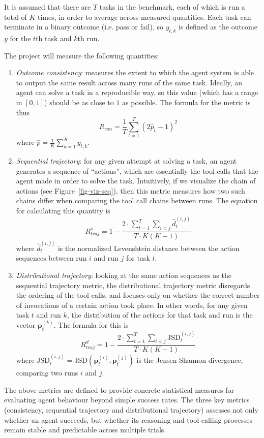 \documentclass[conference]{IEEEtran}
\begin{document}
It is assumed that there are $T$ tasks in the benchmark, each of which is run a total of $K$ times,
in order to average across measured quantities.
Each task can terminate in a binary outcome (i.e. pass or fail), so $y_{t,k}$ is defined as the
outcome $y$ for the $t$th task and $k$th run.

The project will measure the following quantities:
\begin{enumerate}
	\item \emph{Outcome consistency}: measures the extent to which the agent system is able to output
		the same result across many runs of the same task. Ideally, an agent can solve a task in a
		reproducible way, so this value (which has a range in $[0,1]$) should be as close to
		$1$ as possible. The formula for the metric is thus
		$$R_{con} = \frac{1}{T} \sum_{t=1}^T (2\hat{p}_t-1)^2$$
		where $\hat{p} = \frac{1}{K} \sum_{k=1}^K y_{t,k}$.\\
	\item \emph{Sequential trajectory}: for any given attempt at solving a task, an agent
		generates a sequence of ``actions'', which are essentially the tool calls that the agent
		made in order to solve the task. Intuitively, if we visualize the chain of actions
		(see Figure~\ref{fig-viz-seq}), then 
		this metric measures how two such chains differ when comparing the tool call chains
		between runs. The equation for calculating this quantity is
		$$R_{traj}^s = 1 - \frac{2\cdot\sum_{t=1}^T \sum_{i<j} \hat{d}_t^{(i,j)}}{T\cdot K (K-1)}$$
		where $\hat{d}_t^{(i,j)}$ is the normalized Levenshtein distance between the action
		sequences between run $i$ and run $j$ for task $t$.
	\item \emph{Distributional trajectory}: looking at the same action sequences as the sequential
		trajectory metric, the distributional trajectory metric disregards the ordering of the tool
		calls, and focuses only on whether the correct number of invocations of a certain action
		took place. In other words, for any given task $t$ and run $k$, the distribution of the actions
		for that task and run is the vector $\textbf{p}_t^{(k)}$.
		The formula for this is
		$$R_{traj}^d = 1 - \frac{2\cdot\sum_{t=1}^T \sum_{i<j} \text{JSD}_t^{(i,j)}}{T\cdot K (K-1)}$$
		where $\text{JSD}_t^{(i,j)} = \text{JSD}(\textbf{p}_t^{(i)}, \textbf{p}_t^{(j)})$ is the
		Jensen-Shannon divergence, comparing two runs $i$ and $j$.
\end{enumerate}
The above metrics are defined to provide concrete statistical measures for evaluating agent behaviour
beyond simple success rates.
The three key metrics (consistency, sequential trajectory and distributional trajectory) assesses
not only whether an agent succeeds,
but whether its reasoning and tool-calling processes remain stable and predictable across multiple trials.
\end{document}
